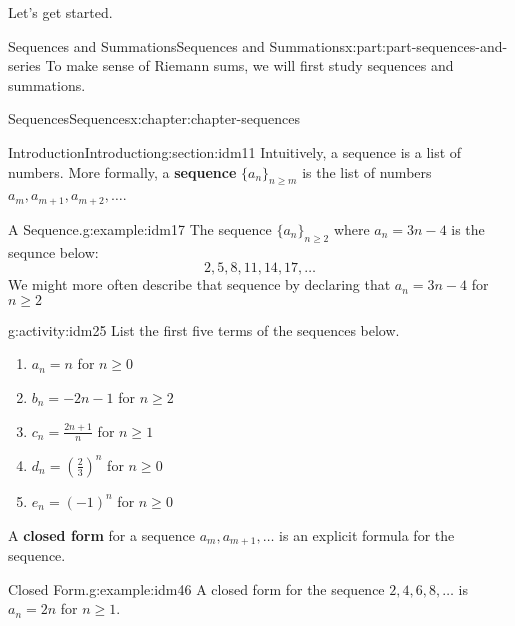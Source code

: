 \documentclass[oneside,10pt,]{book}
\newcommand{\terminology}[1]{\textbf{#1}}
\begin{document}
Let's get started.%
%
%
\typeout{************************************************}
\typeout{************************************************}
%
\begin{partptx}{Sequences and Summations}{}{Sequences and Summations}{}{}{x:part:part-sequences-and-series}
 To make sense of Riemann sums, we will first study sequences and summations. %
%
\typeout{************************************************}
\typeout{************************************************}
%
\begin{chapterptx}{Sequences}{}{Sequences}{}{}{x:chapter:chapter-sequences}
%
%
\typeout{************************************************}
\typeout{************************************************}
%
\begin{sectionptx}{Introduction}{}{Introduction}{}{}{g:section:idm11}
Intuitively, a sequence is a list of numbers. More formally, a \terminology{sequence} \(\{a_n\}_{n \geq m}\) is the list of numbers \(a_m, a_{m+1}, a_{m+2}, \dots\).%
\begin{example}{A Sequence.}{g:example:idm17}%
The sequence \(\{a_n\}_{n \geq 2}\) where \(a_n = 3n-4\) is the sequnce below:%
\begin{equation*}
2, 5, 8, 11, 14, 17, \dots
\end{equation*}
We might more often describe that sequence by declaring that \(a_n = 3n-4\) for \(n \geq 2\)%
\end{example}
\begin{activity}{}{g:activity:idm25}%
List the first five terms of the sequences below.%
\begin{enumerate}[font=\bfseries,label=(\alph*),ref=\alph*]
\item{}\(a_n = n\) for \(n \geq 0\)\item{}\(b_n = -2n-1\) for \(n \geq 2\)\item{}\(c_n = \frac{2n+1}{n}\) for \(n \geq 1\)\item{}\(d_n = \left(\frac{2}{3}\right)^n\) for \(n \geq 0\)\item{}\(e_n = (-1)^n\) for \(n \geq 0\)\end{enumerate}
\end{activity}
A \terminology{closed form} for a sequence \(a_m, a_{m+1}, \dots\) is an explicit formula for the sequence.%
\begin{example}{Closed Form.}{g:example:idm46}%
A closed form for the sequence \(2, 4, 6, 8, \dots\) is \(a_n = 2n\) for \(n \geq 1\).%

\end{example}
\end{sectionptx}
\end{chapterptx}
\end{partptx}
\end{document}
